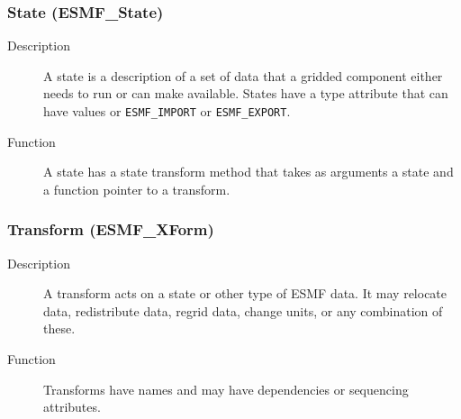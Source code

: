 \subsubsection{State (ESMF\_State)}
\begin{description}
\item [Description] A state is a description of a set of data that a 
gridded component either needs to run or can make available.  States
have a type attribute that can have values or {\tt ESMF\_IMPORT} or
{\tt ESMF\_EXPORT}.
\item [Function] A state has a state transform method that
takes as arguments a state and a function pointer to a transform.

\end{description}

\subsubsection{Transform (ESMF\_XForm)} 
\begin{description}
\item [Description] A transform acts on a state or other type of 
ESMF data.  It may relocate data, redistribute data, regrid data, 
change units, or any combination of these.  
\item [Function] Transforms have names and may have dependencies
or sequencing attributes. 

\end{description}







